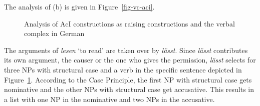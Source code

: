 The analysis of (b) is given in Figure~\vref{fig-vc-aci}.
\begin{figure}
\caption{\label{fig-vc-aci}Analysis of AcI constructions as raising constructions and the verbal
  complex in German}
\end{figure}
The arguments of \emph{lesen} `to read' are taken over by \emph{lässt}. Since \emph{lässt}
contributes its own argument, the causer or the one who gives the permission, \emph{lässt} selects
for three NPs with structural case and a verb in the specific sentence depicted in
Figure~\ref{fig-vc-aci}. According to the Case Principle, the first NP with structural case gets
nominative and the other NPs with structural case get accusative. This results in a list with one
NP in the nominative and two NPs in the accusative.

